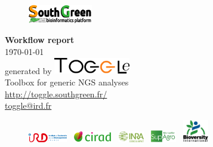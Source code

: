 \begin{titlepage}

\vspace*{3cm}

\begin{center}

\begin{figure}[t]
\includegraphics[width=0.25\textwidth,right]{../img/SGLogo.png}
\end{figure}

\Huge \textbf {Workflow report}\\[0.2in]
\Large \today\\[1.5in]

\normalsize generated by \includegraphics[width=0.25\textwidth]{../img/toggleLogo2.png} \\[0.1in]
\small Toolbox for generic NGS analyses\\[0.5in]
\small\url{http://toggle.southgreen.fr/}\\
    	\href{mailto:toggle@ird.fr}{toggle@ird.fr}\\
        \vspace{0.7in}
\centering 



\begin{figure}[b]
\centering
\includegraphics[width=0.15\textwidth]{../img/irdLogo.png}
\,
\includegraphics[width=0.15\textwidth]{../img/ciradLogo.png}
\,
\includegraphics[width=0.1\textwidth]{../img/inraLogo.png}
\,
\includegraphics[width=0.1\textwidth]{../img/supagroLogo.png}
\,
\includegraphics[width=0.1\textwidth]{../img/bioversityLogo.png}
\end{figure}

\end{center}

\end{titlepage}

